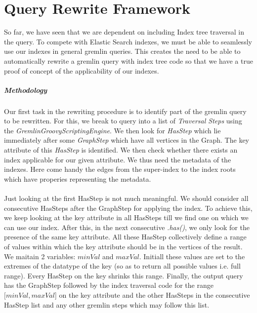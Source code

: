 

\chapter{Query Rewrite Framework} %

\label{Chapter 6} %

So far, we have seen that we are dependent on including Index tree traversal in the query. To compete with Elastic Search indexes, we must be able to seamlessly use our indexes in general gremlin queries. This creates the need to be able to automatically rewrite a gremlin query with index tree code so that we have a true proof of concept of the applicability of our indexes.

\paragraph{Methodology}
$\:$\\
Our first task in the rewriting procedure is to identify part of the gremlin  query to be rewritten. For this, we break to query into a list of \textit{Traversal Steps} using the \textit{GremlinGroovyScriptingEngine}. We then look for \textit{HasStep} which lie immediately after some \textit{GraphStep} which have all vertices in the Graph. The key attribute of this \textit{HasStep} is identified. We then check whether there exists an index applicable for our given attribute. We thus need the metadata of the indexes. Here come handy the edges from the super-index to the index roots which have properies representing the metadata.
\\\\
Just looking at the first HasStep is not much meaningful. We should consider all consecutive HasSteps after the GraphStep for applying the index. To achieve this, we keep looking at the key attribute in all HasSteps till we find one on which we can use our index. After this, in the next consecutive \textit{.has()}, we only look for the presence of the same key attribute. All these HasStep collectively define a range of values within which the key attribute should be in the vertices of the result. We maitain 2 variables: $minVal$ and $maxVal$. Initiall these values are set to the extremes of the datatype of the key (so as to return all possible values i.e. full range). Every HasStep on the key shrinks this range. Finally, the output query has the GraphStep followed by the index traversal code for the range $[minVal, maxVal$] on the key attribute and the other HasSteps in the consecutive HasStep list and any other gremlin steps which may follow this list.